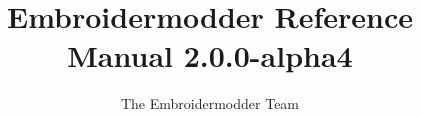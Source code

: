 
\usepackage[utf8]{inputenc}
\usepackage[T1]{fontenc}

\usepackage{courier}
\usepackage{tgbonum}

\usepackage{geometry}
\usepackage{multicol}
\usepackage{amsmath}
\usepackage{amssymb}
\usepackage{listings}
\usepackage{hyperref}
\usepackage{natbib}
\usepackage{fancyhdr}
\usepackage{imakeidx}
\usepackage{graphicx}
\usepackage{color}
\usepackage{xcolor}
\usepackage{longtable}
\usepackage{booktabs}


\geometry{
    margin=1.4in,
    marginparwidth=0.8in
}

\newcommand{\embversion}{2.0.0-alpha4}
\newcommand{\version}{\embversion}
\newcommand{\libembversion}{1.0.0-alpha}
\newcommand{\publicationdate}{August 2023}

\newcommand{\todo}[1]{\marginpar{\emph{TODO}\\{\footnotesize #1}}}

\makeindex

\title{Embroidermodder Reference Manual \embversion}
\author{The Embroidermodder Team}

\lstset{
  basicstyle=\ttfamily\footnotesize,
  language=C,
  numbers=left,
  extendedchars=true,
  title=\lstname,
  frame=single
}

\hypersetup{
  colorlinks=true,
  breaklinks=true,
  linkcolor=black,
  filecolor=black,      
  urlcolor=black,
  citecolor=black
}



